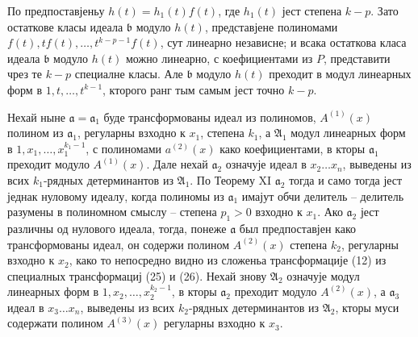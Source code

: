\documentclass[11pt]{article}
\providecommand{\aideal}{\mathfrak a}
\providecommand{\bideal}{\mathfrak b}
\begin{document}
По предпоставјеньу $h(t)=h_1(t)f(t)$, где $h_1(t)$ јест степена $k-p$. Зато остаткове класы идеала $\bideal$ модуло $h(t)$, представјене полиномами $f(t),tf(t),\ldots,t^{k-p-1}f(t)$, сут линеарно независне; и всака остаткова класа идеала $\bideal$ модуло $h(t)$ можно линеарно, с коефициентами из $P$, представити чрез те $k-p$ специалне класы. Але $\bideal$ модуло $h(t)$ преходит в модул линеарных форм в $1,t,\ldots,t^{k-1}$, кторого ранг тым самым јест точно $k-p$.

Нехай ныне $\aideal=\aideal_1$ буде трансформованы идеал из полиномов, $A^{(1)}(x)$ полином из $\aideal_1$, регуларны взходно к $x_1$, степена $k_1$, а $\mathfrak A_1$ модул линеарных форм в $1,x_1,\ldots,x_1^{k_1-1}$, с полиномами $a^{(2)}(x)$ како коефициентами, в кторы $\aideal_1$ преходит модуло $A^{(1)}(x)$. Дале нехай $\aideal_2$ означује идеал в $x_2\ldots x_n$, выведены из всих $k_1$-рядных детерминантов из $\mathfrak A_1$. По Теорему XI $\aideal_2$ тогда и само тогда јест једнак нуловому идеалу, когда полиномы из $\aideal_1$ имајут обчи делитель -- делитель разумены в полиномном смыслу -- степена $p_1>0$ взходно к $x_1$. Ако $\aideal_2$ јест различны од нулового идеала, тогда, понеже $\aideal$ был предпоставјен како трансформованы идеал, он содержи полином $A^{(2)}(x)$ степена $k_2$, регуларны взходно к $x_2$, како то непосредно видно из сложеньа трансформације (12) из специалных трансформациј (25) и (26). Нехай знову $\mathfrak A_2$ означује модул линеарных форм в $1,x_2,\ldots,x_2^{k_2-1}$, в кторы $\aideal_2$ преходит модуло $A^{(2)}(x)$, а $\aideal_3$ идеал в $x_3\ldots x_n$, выведены из всих $k_2$-рядных детерминантов из $\mathfrak A_2$, кторы муси содержати полином $A^{(3)}(x)$ регуларны взходно к $x_3$.
\end{document}
